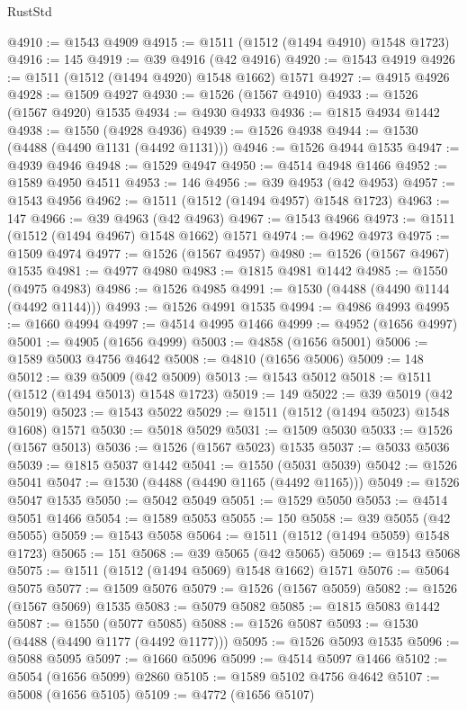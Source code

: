 \begin{lexlean}{RustStd}
\begin{coremodule}
{\begin{coremodule}
{{{{{{{{{{{{{{{{{{{{{{{{{{{{{{{{{{{@4910 := @1543 @4909
@4915 := @1511 (@1512 (@1494 @4910) @1548 @1723)
@4916 := 145
@4919 := @39 @4916 (@42 @4916)
@4920 := @1543 @4919
@4926 := @1511 (@1512 (@1494 @4920) @1548 @1662) @1571
@4927 := @4915 @4926
@4928 := @1509 @4927
@4930 := @1526 (@1567 @4910)
@4933 := @1526 (@1567 @4920) @1535
@4934 := @4930 @4933
@4936 := @1815 @4934 @1442
@4938 := @1550 (@4928 @4936)
@4939 := @1526 @4938
@4944 := @1530 (@4488 (@4490 @1131 (@4492 @1131)))
@4946 := @1526 @4944 @1535
@4947 := @4939 @4946
@4948 := @1529 @4947
@4950 := @4514 @4948 @1466
@4952 := @1589 @4950 @4511
@4953 := 146
@4956 := @39 @4953 (@42 @4953)
@4957 := @1543 @4956
@4962 := @1511 (@1512 (@1494 @4957) @1548 @1723)
@4963 := 147
@4966 := @39 @4963 (@42 @4963)
@4967 := @1543 @4966
@4973 := @1511 (@1512 (@1494 @4967) @1548 @1662) @1571
@4974 := @4962 @4973
@4975 := @1509 @4974
@4977 := @1526 (@1567 @4957)
@4980 := @1526 (@1567 @4967) @1535
@4981 := @4977 @4980
@4983 := @1815 @4981 @1442
@4985 := @1550 (@4975 @4983)
@4986 := @1526 @4985
@4991 := @1530 (@4488 (@4490 @1144 (@4492 @1144)))
@4993 := @1526 @4991 @1535
@4994 := @4986 @4993
@4995 := @1660 @4994
@4997 := @4514 @4995 @1466
@4999 := @4952 (@1656 @4997)
@5001 := @4905 (@1656 @4999)
@5003 := @4858 (@1656 @5001)
@5006 := @1589 @5003 @4756 @4642
@5008 := @4810 (@1656 @5006)
@5009 := 148
@5012 := @39 @5009 (@42 @5009)
@5013 := @1543 @5012
@5018 := @1511 (@1512 (@1494 @5013) @1548 @1723)
@5019 := 149
@5022 := @39 @5019 (@42 @5019)
@5023 := @1543 @5022
@5029 := @1511 (@1512 (@1494 @5023) @1548 @1608) @1571
@5030 := @5018 @5029
@5031 := @1509 @5030
@5033 := @1526 (@1567 @5013)
@5036 := @1526 (@1567 @5023) @1535
@5037 := @5033 @5036
@5039 := @1815 @5037 @1442
@5041 := @1550 (@5031 @5039)
@5042 := @1526 @5041
@5047 := @1530 (@4488 (@4490 @1165 (@4492 @1165)))
@5049 := @1526 @5047 @1535
@5050 := @5042 @5049
@5051 := @1529 @5050
@5053 := @4514 @5051 @1466
@5054 := @1589 @5053
@5055 := 150
@5058 := @39 @5055 (@42 @5055)
@5059 := @1543 @5058
@5064 := @1511 (@1512 (@1494 @5059) @1548 @1723)
@5065 := 151
@5068 := @39 @5065 (@42 @5065)
@5069 := @1543 @5068
@5075 := @1511 (@1512 (@1494 @5069) @1548 @1662) @1571
@5076 := @5064 @5075
@5077 := @1509 @5076
@5079 := @1526 (@1567 @5059)
@5082 := @1526 (@1567 @5069) @1535
@5083 := @5079 @5082
@5085 := @1815 @5083 @1442
@5087 := @1550 (@5077 @5085)
@5088 := @1526 @5087
@5093 := @1530 (@4488 (@4490 @1177 (@4492 @1177)))
@5095 := @1526 @5093 @1535
@5096 := @5088 @5095
@5097 := @1660 @5096
@5099 := @4514 @5097 @1466
@5102 := @5054 (@1656 @5099) @2860
@5105 := @1589 @5102 @4756 @4642
@5107 := @5008 (@1656 @5105)
@5109 := @4772 (@1656 @5107)
}}}}}}}}}}}}}}}}}}}}}}}}}}}}}}}}}}}
\end{coremodule}}
\end{coremodule}
\end{lexlean}
